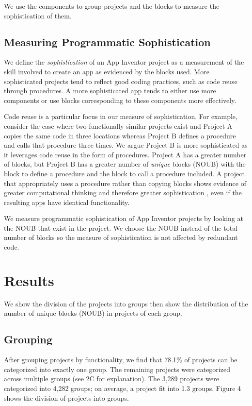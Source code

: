 \documentclass[conference]{IEEEtran}
\begin{document}
We use the components to group projects and the blocks to measure the sophistication of them.

\subsection{Measuring Programmatic Sophistication}
We define the \emph{sophistication} of an App Inventor project as a measurement of the skill involved to create an app as evidenced by the blocks used. More sophisticated projects tend to reflect good coding practices, such as code reuse through procedures. A more sophisticated app tends to either use more components or use blocks corresponding to these components more effectively. 

Code reuse is a particular focus in our measure of sophistication. For example, consider the case where two functionally similar projects exist and Project A copies the same code in three locations whereas Project B defines a procedure and calls that procedure three times. We argue Project B is more sophisticated as it leverages code reuse in the form of procedures. Project A has a greater number of blocks, but Project B has a greater number of \emph{unique} blocks (NOUB) with the block to define a procedure and the block to call a procedure included. A project that appropriately uses a procedure rather than copying blocks shows evidence of greater computational thinking and therefore greater sophistication \cite{rubric:sherman}, even if the resulting apps have identical functionality.

We measure programmatic sophistication of App Inventor projects by looking at the NOUB that exist in the project. We choose the NOUB instead of the total number of blocks so the measure of sophistication is not affected by redundant code. 

\section{Results}
We show the division of the projects into groups then show the distribution of the number of unique blocks (NOUB) in projects of each group. 


\subsection{Grouping}
After grouping projects by functionality, we find that 78.1\% of projects can be categorized into exactly one group. The remaining projects were categorized across multiple groups (see 2C for explanation). The 3,289 projects were categorized into 4,282 groups; on average, a project fit into 1.3 groups. Figure 4 shows the division of projects into groups.
\end{document}
